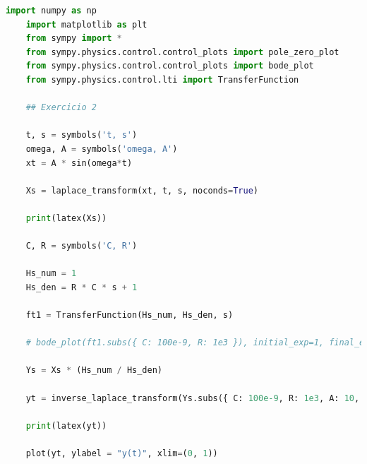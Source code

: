 \documentclass[12pt]{scrartcl}
\begin{document}
\begin{lstlisting}[language=Python, breaklines=true, basicstyle=\scriptsize]
    import numpy as np
    import matplotlib as plt
    from sympy import *
    from sympy.physics.control.control_plots import pole_zero_plot
    from sympy.physics.control.control_plots import bode_plot
    from sympy.physics.control.lti import TransferFunction
    
    ## Exercicio 2
    
    t, s = symbols('t, s')
    omega, A = symbols('omega, A')
    xt = A * sin(omega*t)
    
    Xs = laplace_transform(xt, t, s, noconds=True)
    
    print(latex(Xs))
    
    C, R = symbols('C, R')
    
    Hs_num = 1
    Hs_den = R * C * s + 1
    
    ft1 = TransferFunction(Hs_num, Hs_den, s)
    
    # bode_plot(ft1.subs({ C: 100e-9, R: 1e3 }), initial_exp=1, final_exp=5, phase_unit='deg', freq_unit='Hz')
    
    Ys = Xs * (Hs_num / Hs_den)
    
    yt = inverse_laplace_transform(Ys.subs({ C: 100e-9, R: 1e3, A: 10, omega: 10000 }), s, t, noconds=True)
    
    print(latex(yt))
    
    plot(yt, ylabel = "y(t)", xlim=(0, 1))    
\end{lstlisting}
\end{document}
